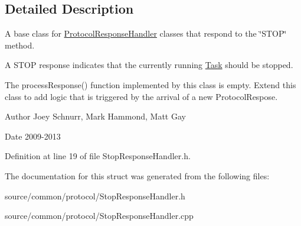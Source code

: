 \subsection{Detailed Description}
A base class for \hyperlink{struct_picto_1_1_protocol_response_handler}{Protocol\-Response\-Handler} classes that respond to the \char`\"{}\-S\-T\-O\-P\char`\"{} method. 

A S\-T\-O\-P response indicates that the currently running \hyperlink{class_picto_1_1_task}{Task} should be stopped.

The process\-Response() function implemented by this class is empty. Extend this class to add logic that is triggered by the arrival of a new Protocol\-Respose. \begin{DoxyAuthor}{Author}
Joey Schnurr, Mark Hammond, Matt Gay 
\end{DoxyAuthor}
\begin{DoxyDate}{Date}
2009-\/2013 
\end{DoxyDate}


Definition at line 19 of file Stop\-Response\-Handler.\-h.



The documentation for this struct was generated from the following files\-:\begin{DoxyCompactItemize}
\item 
source/common/protocol/Stop\-Response\-Handler.\-h\item 
source/common/protocol/Stop\-Response\-Handler.\-cpp\end{DoxyCompactItemize}
